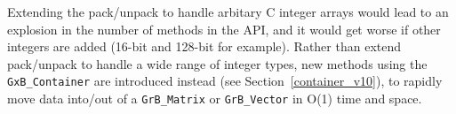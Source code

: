 Extending the pack/unpack to handle arbitary C integer arrays would lead to an
explosion in the number of methods in the API, and it would get worse if other
integers are added (16-bit and 128-bit for example).  Rather than extend
pack/unpack to handle a wide range of integer types, new methods using the
\verb'GxB_Container' are introduced instead (see Section~\ref{container_v10}),
to rapidly move data into/out of a \verb'GrB_Matrix' or \verb'GrB_Vector' in
O(1) time and space.

